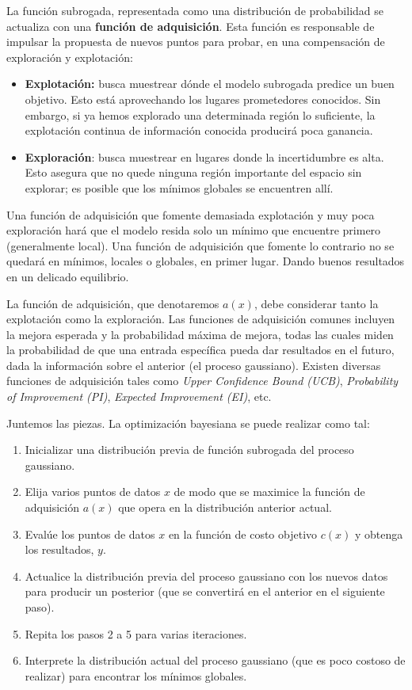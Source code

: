 \documentclass[a4paper,12pt]{article}
\begin{document}
La función subrogada, representada como una distribución de probabilidad se actualiza con una \textbf{función de adquisición}. Esta función es responsable de impulsar la propuesta de nuevos puntos para probar, en una compensación de exploración y explotación:
\begin{itemize}[noitemsep, topsep=2pt]
	\item \textbf{Explotación:} busca muestrear dónde el modelo subrogada predice un buen objetivo. Esto está aprovechando los lugares prometedores conocidos. Sin embargo, si ya hemos explorado una determinada región lo suficiente, la explotación continua de información conocida producirá poca ganancia.
	\item \textbf{Exploración}: busca muestrear en lugares donde la incertidumbre es alta. Esto asegura que no quede ninguna región importante del espacio sin explorar; es posible que los mínimos globales se encuentren allí.
\end{itemize}

Una función de adquisición que fomente demasiada explotación y muy poca exploración hará que el modelo resida solo un mínimo que encuentre primero (generalmente local). Una función de adquisición que fomente lo contrario no se quedará en mínimos, locales o globales, en primer lugar. Dando buenos resultados en un delicado equilibrio.

La función de adquisición, que denotaremos $a(x)$, debe considerar tanto la explotación como la exploración. Las funciones de adquisición comunes incluyen la mejora esperada y la probabilidad máxima de mejora, todas las cuales miden la probabilidad de que una entrada específica pueda dar resultados en el futuro, dada la información sobre el anterior (el proceso gaussiano). Existen diversas funciones de adquisición tales como \textit{Upper Confidence Bound (UCB)}, \textit{Probability of Improvement (PI)}, \textit{Expected Improvement (EI)}, etc. \citep{Agnihotri2020May}

Juntemos las piezas. La optimización bayesiana se puede realizar como tal:
\begin{enumerate}[noitemsep, topsep=2pt]
	\item Inicializar una distribución previa de función subrogada del proceso gaussiano.
	\item Elija varios puntos de datos $x$ de modo que se maximice la función de adquisición $a(x)$ que opera en la distribución anterior actual.
	\item Evalúe los puntos de datos $x$ en la función de costo objetivo $c(x)$ y obtenga los resultados, $y$.
	\item Actualice la distribución previa del proceso gaussiano con los nuevos datos para producir un posterior (que se convertirá en el anterior en el siguiente paso).
	\item Repita los pasos 2 a 5 para varias iteraciones.
	\item Interprete la distribución actual del proceso gaussiano (que es poco costoso de realizar) para encontrar los mínimos globales.
\end{enumerate}
\end{document}
